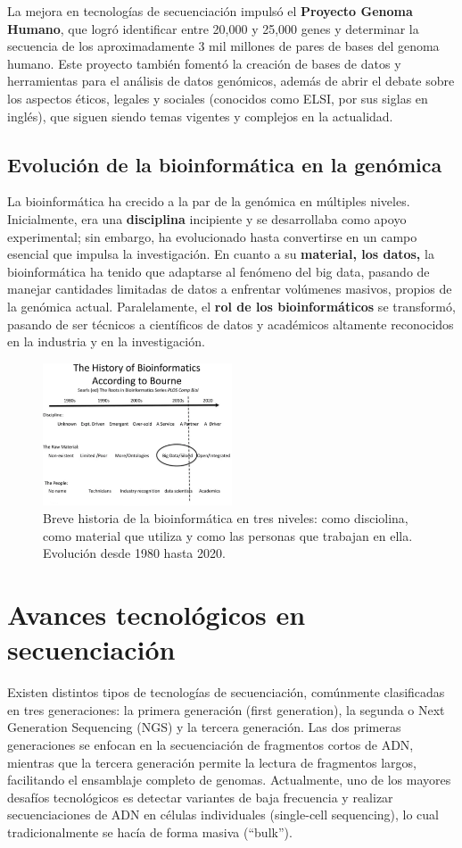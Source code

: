 La mejora en tecnologías de secuenciación impulsó el \textbf{Proyecto Genoma Humano}, que logró identificar entre 20,000 y 25,000 genes y determinar la secuencia de los aproximadamente 3 mil millones de pares de bases del genoma humano. Este proyecto también fomentó la creación de bases de datos y herramientas para el análisis de datos genómicos, además de abrir el debate sobre los aspectos éticos, legales y sociales (conocidos como ELSI, por sus siglas en inglés), que siguen siendo temas vigentes y complejos en la actualidad.

\subsection{Evolución de la bioinformática en la genómica}
La bioinformática ha crecido a la par de la genómica en múltiples niveles. Inicialmente, era una \textbf{disciplina} incipiente y se desarrollaba como apoyo experimental; sin embargo, ha evolucionado hasta convertirse en un campo esencial que impulsa la investigación. En cuanto a su \textbf{material, los datos,} la bioinformática ha tenido que adaptarse al fenómeno del big data, pasando de manejar cantidades limitadas de datos a enfrentar volúmenes masivos, propios de la genómica actual. Paralelamente, el \textbf{rol de los bioinformáticos} se transformó, pasando de ser técnicos a científicos de datos y académicos altamente reconocidos en la industria y en la investigación.

\begin{figure}[htbp]
\centering
\includegraphics[width = 0.5\textwidth]{figs/history-bioinfo.png}
\caption{Breve historia de la bioinformática en tres niveles: como disciolina, como material que utiliza y como las personas que trabajan en ella. Evolución desde 1980 hasta 2020.}
\end{figure}

\section{Avances tecnológicos en secuenciación}
Existen distintos tipos de tecnologías de secuenciación, comúnmente clasificadas en tres generaciones: la primera generación (first generation), la segunda o Next Generation Sequencing (NGS) y la tercera generación. Las dos primeras generaciones se enfocan en la secuenciación de fragmentos cortos de ADN, mientras que la tercera generación permite la lectura de fragmentos largos, facilitando el ensamblaje completo de genomas. Actualmente, uno de los mayores desafíos tecnológicos es detectar variantes de baja frecuencia y realizar secuenciaciones de ADN en células individuales (single-cell sequencing), lo cual tradicionalmente se hacía de forma masiva (“bulk”).

